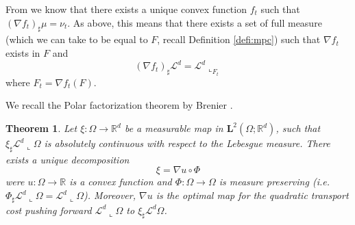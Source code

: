 \documentclass[11pt, twoside, reqno]{amsart}
\theoremstyle{definition} \newtheorem{definition}{Definition}[section]
\theoremstyle{definition} \newtheorem{remark}[definition]{Remark}
\theoremstyle{plain} \newtheorem{lemma}[definition]{Lemma}
\theoremstyle{plain} \newtheorem{proposition}[definition]{Proposition}
\theoremstyle{plain} \newtheorem{theorem}[definition]{Theorem}
\theoremstyle{plain} \newtheorem{corollary}[definition]{Corollary}
\theoremstyle{definition} \newtheorem{example}[definition]{Example}
\theoremstyle{plain} \newtheorem{claim}[clai]{Claim}
\theoremstyle{definition} \newtheorem{assumption}[definition]{Assumption}
\newcommand{\1}{\mathbbm 1}
\newcommand{\rest}{\llcorner}
\numberwithin{equation}{section} %
\theoremstyle{plain} \newtheorem*{theorem*}{Theorem}
\theoremstyle{plain} \newtheorem{mthm}[maintheorem]{Main Theorem}
\theoremstyle{plain} \newtheorem*{mthm*}{Main Theorem}
\theoremstyle{plain} \newtheorem*{conjecture*}{Conjecture}
\theoremstyle{plain} \newtheorem{conjecture}[definition]{Conjecture}
\theoremstyle{plain} \newtheorem*{problem*}{Problem}
\begin{document}
From \cite{Bre91} we know that there exists a unique convex function $f_t$ such that $(\nabla f_t)_\sharp \mu = \nu_t$.
As above, this means that there exists a set of full measure (which we can take to be equal to $F$, recall Definition \ref{defi:mpc}) such that $\nabla {f_t}$ exists in $F$ and
\begin{equation*}
(\nabla {f_t})_\sharp \mathscr L^d = \mathscr L^d \rest_{F_t}
\end{equation*}
where $F_t = \nabla f_t(F)$.

\vspace{0.3cm}
We recall the Polar factorization theorem by Brenier \cite{Bre91}. 
\begin{theorem}\label{thm:pd}
    Let $\xi : \Omega \to \mathbb R^d$ be a measurable map in $\mathbf L^2(\Omega; \mathbb R^d)$, such that $\xi_\sharp \mathscr L^d \llcorner \Omega$ is absolutely continuous with respect to the Lebesgue measure. There exists a unique decomposition 
    $$
    \xi = \nabla u \circ \Phi
    $$
    were $u: \Omega \to \mathbb R$ is a convex function and $\Phi : \Omega \to \Omega$ is measure preserving (i.e. $\Phi_\sharp \mathscr L^d \llcorner \Omega = \mathscr L^d \llcorner \Omega$). Moreover, $\nabla u$ is the optimal map for the quadratic transport cost  pushing forward $\mathscr L^d \llcorner \Omega$ to $\xi_\sharp \mathscr L^d \Omega$.
\end{theorem}
\end{document}
